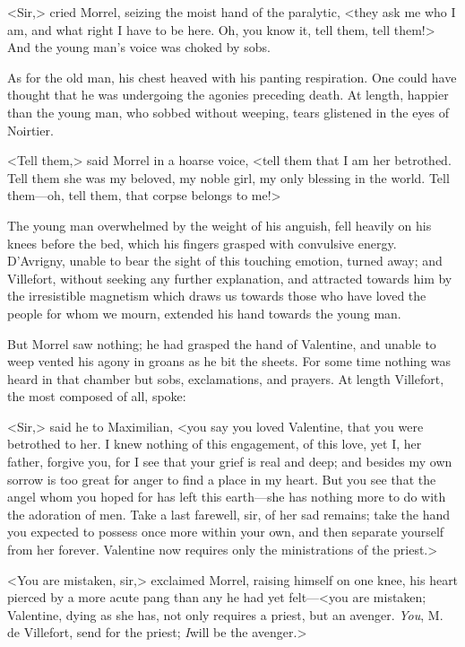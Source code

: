  <Sir,> cried Morrel, seizing the moist hand of the paralytic, <they ask me who I am, and what right I have to be here. Oh, you know it, tell them, tell them!> And the young man's voice was choked by sobs. 

 As for the old man, his chest heaved with his panting respiration. One could have thought that he was undergoing the agonies preceding death. At length, happier than the young man, who sobbed without weeping, tears glistened in the eyes of Noirtier. 

 <Tell them,> said Morrel in a hoarse voice, <tell them that I am her betrothed. Tell them she was my beloved, my noble girl, my only blessing in the world. Tell them—oh, tell them, that corpse belongs to me!> 

 The young man overwhelmed by the weight of his anguish, fell heavily on his knees before the bed, which his fingers grasped with convulsive energy. D'Avrigny, unable to bear the sight of this touching emotion, turned away; and Villefort, without seeking any further explanation, and attracted towards him by the irresistible magnetism which draws us towards those who have loved the people for whom we mourn, extended his hand towards the young man. 

 But Morrel saw nothing; he had grasped the hand of Valentine, and unable to weep vented his agony in groans as he bit the sheets. For some time nothing was heard in that chamber but sobs, exclamations, and prayers. At length Villefort, the most composed of all, spoke: 

 <Sir,> said he to Maximilian, <you say you loved Valentine, that you were betrothed to her. I knew nothing of this engagement, of this love, yet I, her father, forgive you, for I see that your grief is real and deep; and besides my own sorrow is too great for anger to find a place in my heart. But you see that the angel whom you hoped for has left this earth—she has nothing more to do with the adoration of men. Take a last farewell, sir, of her sad remains; take the hand you expected to possess once more within your own, and then separate yourself from her forever. Valentine now requires only the ministrations of the priest.>

<You are mistaken, sir,> exclaimed Morrel, raising himself on one knee, his heart pierced by a more acute pang than any he had yet felt—<you are mistaken; Valentine, dying as she has, not only requires a priest, but an avenger. \textit{You}, M. de Villefort, send for the priest; \textit{I}will be the avenger.>

